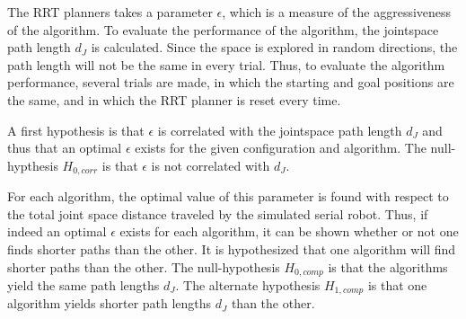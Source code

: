 The RRT planners takes a parameter \(\epsilon\),
which is a measure of the aggressiveness of the algorithm.
To evaluate the performance of the algorithm,
the jointspace path length \(d_J\) is calculated.
Since the space is explored in random directions,
the path length will not be the same in every trial.
Thus, to evaluate the algorithm performance, several trials are made,
in which the starting and goal positions are the same,
and in which the RRT planner is reset every time.

A first hypothesis is that \(\epsilon\) is correlated with the
jointspace path length \(d_J\) and thus that an optimal \(\epsilon\) exists
for the given configuration and algorithm. The null-hypthesis
\(H_{0,corr}\) is that \(\epsilon\) is not correlated with \(d_J\).

For each algorithm, the optimal value of this parameter is found
with respect to the total joint space distance traveled by the simulated serial robot.
Thus, if indeed an optimal \(\epsilon\) exists for each algorithm,
it can be shown whether or not one finds shorter paths than the other.
It is hypothesized that one algorithm will find shorter paths than the other.
The null-hypothesis \(H_{0,comp}\) is that the algorithms yield
the same path lengths \(d_J\). The alternate hypothesis \(H_{1,comp}\)
is that one algorithm yields shorter path lengths \(d_J\) than the other.